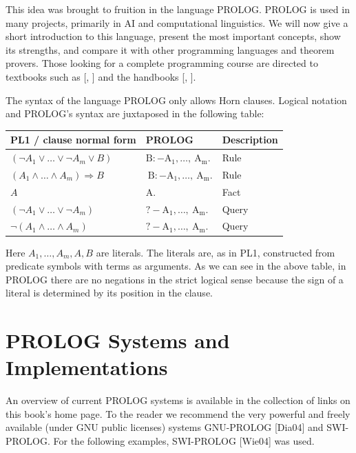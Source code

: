 \documentclass[10pt]{book}
\begin{document}
This idea was brought to fruition in the language PROLOG. PROLOG is used in many projects, primarily in AI and computational linguistics. We will now give a short introduction to this language, present the most important concepts, show its strengths, and compare it with other programming languages and theorem provers. Those looking for a complete programming course are directed to textbooks such as [\cite{bratko2011prolog}, \cite{clocksin1994prolog}] and the handbooks [\cite{wielemaker2004swiprolog}, \cite{diaz2004gnuprolog}].

The syntax of the language PROLOG only allows Horn clauses. Logical notation and PROLOG's syntax are juxtaposed in the following table:

\begin{center}
\begin{tabular}{lll}
\hline
PL1 / clause normal form & PROLOG & Description \\
\hline
$\left(\neg A_{1} \vee \ldots \vee \neg A_{m} \vee B\right)$ & $\mathrm{B}:-\mathrm{A}_{1}, \ldots, \mathrm{~A}_{\mathrm{m}}$. & Rule \\
\hline
$\left(A_{1} \wedge \ldots \wedge A_{m}\right) \Rightarrow B$ & $\mathrm{~B}:-\mathrm{A}_{1}, \ldots, \mathrm{~A}_{\mathrm{m}}$. & Rule \\
\hline
$A$ & A. & Fact \\
\hline
$\left(\neg A_{1} \vee \ldots \vee \neg A_{m}\right)$ & $?-\mathrm{A}_{1}, \ldots, \mathrm{~A}_{\mathrm{m}}$. & Query \\
\hline
$\neg\left(A_{1} \wedge \ldots \wedge A_{m}\right)$ & $?-\mathrm{A}_{1}, \ldots, \mathrm{~A}_{\mathrm{m}}$. & Query \\
\hline
\end{tabular}
\end{center}

Here $A_{1}, \ldots, A_{m}, A, B$ are literals. The literals are, as in PL1, constructed from predicate symbols with terms as arguments. As we can see in the above table, in PROLOG there are no negations in the strict logical sense because the sign of a literal is determined by its position in the clause.

\section{PROLOG Systems and Implementations}
An overview of current PROLOG systems is available in the collection of links on this book's home page. To the reader we recommend the very powerful and freely available (under GNU public licenses) systems GNU-PROLOG [Dia04] and SWI-PROLOG. For the following examples, SWI-PROLOG [Wie04] was used.
\end{document}
